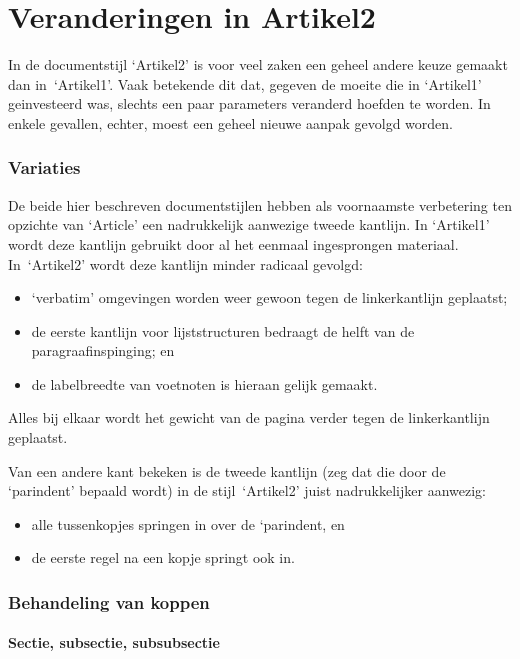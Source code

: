 \documentclass[a4paper]{artikel1} %
\begin{document}
 
 
\part{Veranderingen in Artikel2}
 
In de documentstijl `Artikel2' is voor veel zaken een geheel andere
keuze gemaakt dan in~`Artikel1'. Vaak betekende dit dat, gegeven de
moeite die in `Artikel1' geinvesteerd was, slechts een paar parameters
veranderd hoefden te worden.  In enkele gevallen, echter, moest een
geheel nieuwe aanpak gevolgd worden.
 
\section{Variaties}
 
De beide hier beschreven documentstijlen hebben als voornaamste
verbetering ten opzichte van `Article' een nadrukkelijk aanwezige
tweede kantlijn.  In `Artikel1' wordt deze kantlijn gebruikt door al
het eenmaal ingesprongen materiaal.  In~`Artikel2' wordt deze kantlijn
minder radicaal gevolgd:
\begin{itemize}
\item`verbatim' omgevingen worden weer gewoon tegen de linkerkantlijn
  geplaatst;
\item de eerste kantlijn voor lijststructuren bedraagt de helft van de
  paragraafinspinging; en
\item de labelbreedte van voetnoten is hieraan gelijk gemaakt.
\end{itemize}
Alles bij elkaar wordt het gewicht van de pagina verder tegen de
linkerkantlijn geplaatst.
 
Van een andere kant bekeken is de tweede kantlijn (zeg dat die door de
`parindent' bepaald wordt) in de stijl~`Artikel2' juist nadrukkelijker
aanwezig:
\begin{itemize}
\item alle tussenkopjes springen in over de `parindent, en
\item de eerste regel na een kopje springt ook in.
\end{itemize}
 
 
\section{Behandeling van koppen}
\subsection{Sectie, subsectie, subsubsectie}
\end{document}
